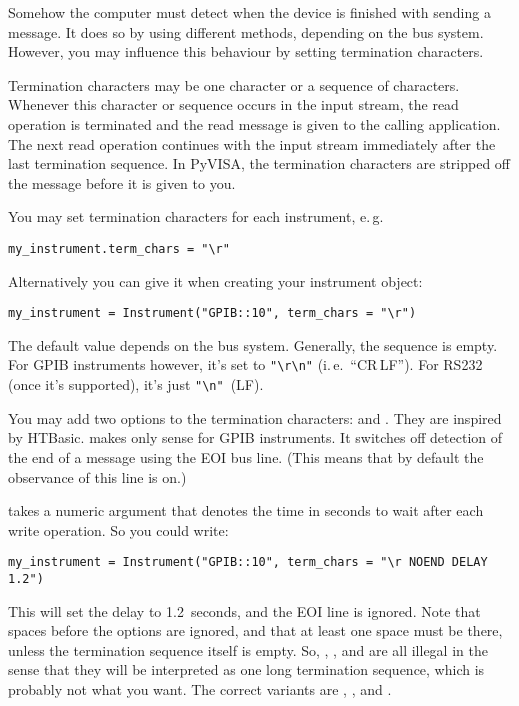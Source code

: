 \documentclass{howto}
\begin{document}
Somehow the computer must detect when the device is finished with sending a
message.  It does so by using different methods, depending on the bus system.
However, you may influence this behaviour by setting termination characters.

Termination characters may be one character or a sequence of characters.
Whenever this character or sequence occurs in the input stream, the read
operation is terminated and the read message is given to the calling
application.  The next read operation continues with the input stream
immediately after the last termination sequence.  In PyVISA, the termination
characters are stripped off the message before it is given to you.

You may set termination characters for each instrument, e.\,g.
\begin{verbatim}
my_instrument.term_chars = "\r"
\end{verbatim}
Alternatively you can give it when creating your instrument object:
\begin{verbatim}
my_instrument = Instrument("GPIB::10", term_chars = "\r")
\end{verbatim}
The default value depends on the bus system.  Generally, the sequence is empty.
For GPIB instruments however, it's set to \verb|"\r\n"| (i.\,e.~``CR\,LF'')\@.
For RS232 (once it's supported), it's just \verb|"\n"|~(LF)\@.

You may add two options to the termination characters:  and
.  They are inspired by HTBasic.   makes only sense for
GPIB instruments.  It switches off detection of the end of a message using the
EOI bus line.  (This means that by default the observance of this line is on.)

 takes a numeric argument that denotes the time in seconds to wait
after each write operation.  So you could write:
\begin{verbatim}
my_instrument = Instrument("GPIB::10", term_chars = "\r NOEND DELAY 1.2")
\end{verbatim}
This will set the delay to 1.2~seconds, and the EOI line is ignored.  Note that
spaces before the options are ignored, and that at least one space must be
there, unless the termination sequence itself is empty.  So, , , and  are all illegal in the sense
that they will be interpreted as one long termination sequence, which is
probably not what you want.  The correct variants are ,
, and .
\end{document}
